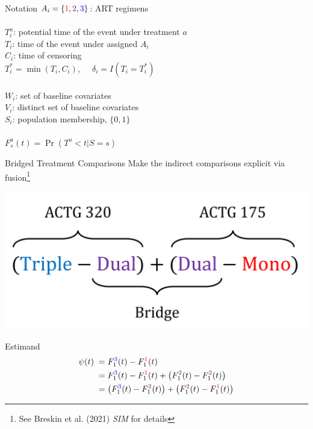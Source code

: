 \documentclass{beamer}
\newcommand{\blue}[1]{\textcolor{blue}{#1}}
\newcommand{\red}[1]{\textcolor{red}{#1}}
\newcommand{\violet}[1]{\textcolor{violet}{#1}}
\begin{document}
\begin{frame}{Notation}
	$A_i=\{\red{1},\violet{2},\blue{3}\}$: ART regimens\\~\\
	
	$T_i^a$: potential time of the event under treatment $a$\\
	$T_i$: time of the event under assigned $A_i$\\
	$C_i$: time of censoring\\
	$T_i^*=\min(T_i,C_i)$,	$\;\;\;\;\delta_i = I(T_i = T_i^*)$\\~\\
	
	$W_i$: set of baseline covariates\\
	$V_i$: distinct set of baseline covariates\\
	$S_i$: population membership, $\{0,1\}$\\~\\
	
	$F_s^a(t) = \Pr(T^a < t | S=s)$
\end{frame}

\begin{frame}{Bridged Treatment Comparisons}
	Make the indirect comparisons explicit via fusion\footnote[frame]{See Breskin et al. (2021) \textit{SIM} for details}\\
	\begin{center}
		\includegraphics[scale=0.2]{images/bridge_actg.png}
	\end{center}
	Estimand
	\begin{equation} 
		\nonumber
		\begin{split}
			\psi(t) \; & = F_1^{\blue{3}}(t) - F_1^{\red{1}}(t) \\
				 & = F_1^{\blue{3}}(t) - F_1^{\red{1}}(t) + \left(F_1^{\violet{2}}(t) - F_1^{\violet{2}}(t)\right) \\
				 & = \left(F_1^{\blue{3}}(t) - F_1^{\violet{2}}(t)\right) + \left(F_1^{\violet{2}}(t) - F_1^{\red{1}}(t)\right)
		\end{split}
	\end{equation}
\end{frame}
\end{document}
